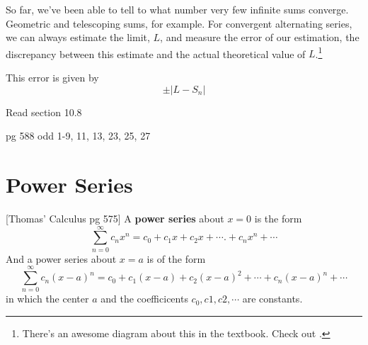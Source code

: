 So far, we've been able to tell to what number very few infinite sums converge.
Geometric and telescoping sums, for example. For convergent alternating series,
we can always estimate the limit, $L$, and measure the error of our estimation,
the discrepancy between this estimate and the actual theoretical value of
$L$.\footnote{There's an awesome diagram about this in the textbook. Check out
  \cite[p.~569 Fig.~10.13]{thomas}.}

This error is given by
\begin{equation}
  \pm | L - S_n |
\end{equation}

\begin{homework}
  Read section 10.8

  pg 588 odd 1-9, 11, 13, 23, 25, 27
\end{homework}

\section{Power Series}[Thomas' Calculus pg 575]
A \textbf{power series} about $x=0$ is the form
\[ \sum_{n=0}^\infty c_n x^n = c_0 + c_1 x + c_2 x + \cdots. + c_n x^n + \cdots
  \]
  And a power series about $x=a$ is of the form
  \begin{equation}\label{eq:powerxa} \sum_{n=0}^\infty c_n (x-a)^n = c_0 + c_1 (x-a) + c_2 (x-a)^2 +
    \cdots + c_n (x-a)^n + \cdots \end{equation}
    in which the center $a$ and the coefficicents $c_0, c1, c2, \cdots$ are
    constants.

